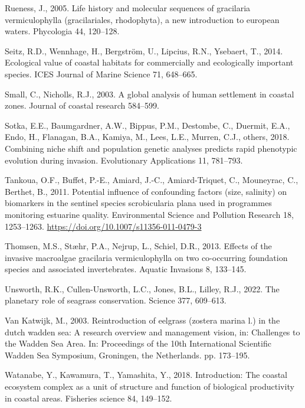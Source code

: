 \documentclass[
  letterpaper,
  DIV=11,
  numbers=noendperiod]{scrartcl}
\newlength{\cslhangindent}
\newenvironment{CSLReferences}[2] %
 {\begin{list}{}{%
  \setlength{\itemindent}{0pt}
  \setlength{\leftmargin}{0pt}
  \setlength{\parsep}{0pt}
  \ifodd #1
   \setlength{\leftmargin}{\cslhangindent}
   \setlength{\itemindent}{-1\cslhangindent}
  \fi
  \setlength{\itemsep}{#2\baselineskip}}}
 {\end{list}}
\begin{document}
\begin{CSLReferences}{1}{0}
Rueness, J., 2005. Life history and molecular sequences of gracilaria
vermiculophylla (gracilariales, rhodophyta), a new introduction to
european waters. Phycologia 44, 120--128.

Seitz, R.D., Wennhage, H., Bergström, U., Lipcius, R.N., Ysebaert, T.,
2014. Ecological value of coastal habitats for commercially and
ecologically important species. ICES Journal of Marine Science 71,
648--665.

Small, C., Nicholls, R.J., 2003. A global analysis of human settlement
in coastal zones. Journal of coastal research 584--599.

Sotka, E.E., Baumgardner, A.W., Bippus, P.M., Destombe, C., Duermit,
E.A., Endo, H., Flanagan, B.A., Kamiya, M., Lees, L.E., Murren, C.J.,
others, 2018. Combining niche shift and population genetic analyses
predicts rapid phenotypic evolution during invasion. Evolutionary
Applications 11, 781--793.

Tankoua, O.F., Buffet, P.-E., Amiard, J.-C., Amiard-Triquet, C.,
Mouneyrac, C., Berthet, B., 2011. Potential influence of confounding
factors (size, salinity) on biomarkers in the sentinel species
scrobicularia plana used in programmes monitoring estuarine quality.
Environmental Science and Pollution Research 18, 1253--1263.
\url{https://doi.org/10.1007/s11356-011-0479-3}

Thomsen, M.S., Stæhr, P.A., Nejrup, L., Schiel, D.R., 2013. Effects of
the invasive macroalgae gracilaria vermiculophylla on two co-occurring
foundation species and associated invertebrates. Aquatic Invasions 8,
133--145.

Unsworth, R.K., Cullen-Unsworth, L.C., Jones, B.L., Lilley, R.J., 2022.
The planetary role of seagrass conservation. Science 377, 609--613.

Van Katwijk, M., 2003. Reintroduction of eelgrass (zostera marina l.) in
the dutch wadden sea: A research overview and management vision, in:
Challenges to the Wadden Sea Area. In: Proceedings of the 10th
International Scientific Wadden Sea Symposium, Groningen, the
Netherlands. pp. 173--195.

Watanabe, Y., Kawamura, T., Yamashita, Y., 2018. Introduction: The
coastal ecosystem complex as a unit of structure and function of
biological productivity in coastal areas. Fisheries science 84,
149--152.


\end{CSLReferences}
\end{document}

